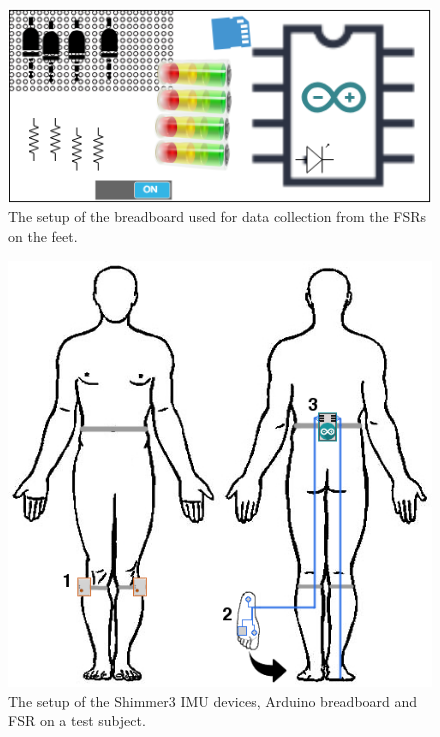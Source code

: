 \begin{figure}[H]
	\includegraphics[width=.6\textwidth]{figures/breadboardSetup}
	\caption{The setup of the breadboard used for data collection from the FSRs on the feet.}
	\label{fig:breadboardSetup}  %
\end{figure}

\begin{figure}[H]
	\includegraphics[width=.6\textwidth]{figures/bodySysSetup}
	\caption{The setup of the Shimmer3 IMU devices, Arduino breadboard and FSR on a test subject.}
	\label{fig:bodySysSetup}  %
\end{figure}




